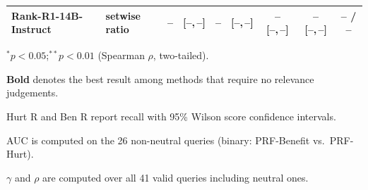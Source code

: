 \begin{table}[htbp]
{\begin{tabular}{@{}llccccccc@{}}
Rank-R1-14B-Instruct   & setwise ratio
  & -- & {[--,\,--]} & -- & {[--,\,--]} & -- {[--,\,--]} & -- {[--,\,--]} & -- / -- \\
\bottomrule
\end{tabular}%
}
\begin{tablenotes}
\small
\item $^*p<0.05$;\quad $^{**}p<0.01$ (Spearman $\rho$, two-tailed).
\item \textbf{Bold} denotes the best result among methods that require no relevance judgements.
\item Hurt R and Ben R report recall with 95\% Wilson score confidence intervals.
\item AUC is computed on the 26 non-neutral queries (binary: PRF-Benefit vs.\ PRF-Hurt).
\item $\gamma$ and $\rho$ are computed over all 41 valid queries including neutral ones.
\end{tablenotes}
\end{table}

